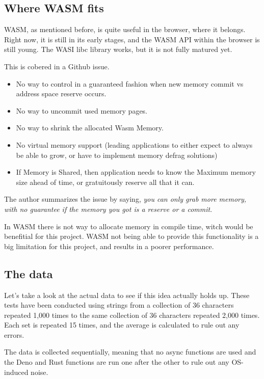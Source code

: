 \documentclass[10pt,journal,compsoc]{IEEEtran}
\begin{document}
\subsection{Where WASM fits}

WASM, as mentioned before, is quite useful in the browser, where it belongs. Right now, it is still in its early stages, and the WASM API within the browser is still young. The WASI libc library works, but it is not fully matured yet.

This is cobered in a Github issue. \cite{WASMBAD}

\begin{itemize}
    \item No way to control in a guaranteed fashion when new memory commit vs address space reserve occurs.
    \item No way to uncommit used memory pages.
    \item No way to shrink the allocated Wasm Memory.
    \item No virtual memory support (leading applications to either expect to always be able to grow, or have to implement memory defrag solutions)
    \item If Memory is Shared, then application needs to know the Maximum memory size ahead of time, or gratuitously reserve all that it can.
\end{itemize}

The author summarizes the issue by saying, \textit{you can only grab more memory, with no guarantee if the memory you got is a reserve or a commit}.

In WASM there is not way to allocate memory in compile time, witch would be benefitial for this project. WASM not being able to provide this functionality is a big limitation for this project, and results in a poorer performance.

\subsection{The data}

Let's take a look at the actual data to see if this idea actually holds up. These tests have been conducted using strings from a collection of 36 characters repeated 1,000 times to the same collection of 36 characters repeated 2,000 times. Each set is repeated 15 times, and the average is calculated to rule out any errors.

The data is collected sequentially, meaning that no async functions are used and the Deno and Rust functions are run one after the other to rule out any OS-induced noise.
\end{document}
